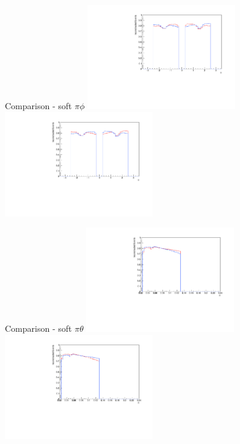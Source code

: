\documentclass[11pt]{beamer}
\begin{document}
\begin{frame}{Comparison - soft $\pi \phi$}
\centering
\includegraphics[width=0.48\textwidth]{third/up_pdf/combined/h_phi_reco_SPi.pdf}
\includegraphics[width=0.48\textwidth]{third/down_pdf/combined/h_phi_reco_SPi.pdf}
\end{frame}
\begin{frame}{Comparison - soft $\pi \theta$}
\centering
\includegraphics[width=0.48\textwidth]{third/up_pdf/combined/h_theta_reco_SPi.pdf}
\includegraphics[width=0.48\textwidth]{third/down_pdf/combined/h_theta_reco_SPi.pdf}
\end{frame}
\end{document}
